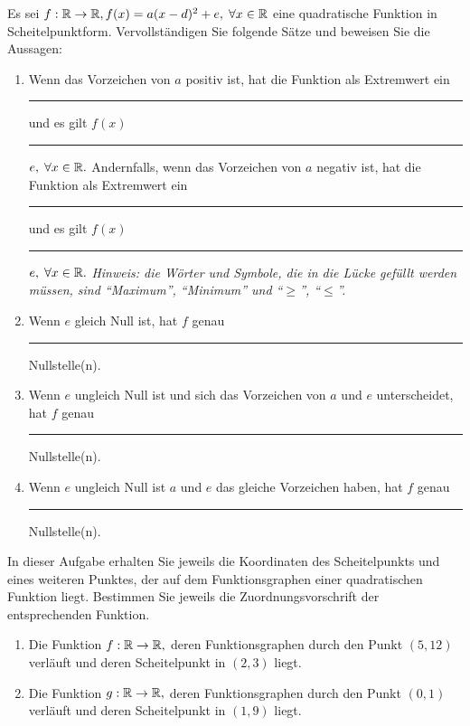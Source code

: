 \documentclass[12pt]{article}
\begin{document}
\begin{exercise}
Es sei $f: \mathbb{R} \rightarrow \mathbb{R}, f(x) = a(x-d)^2 + e, \; \forall x \in \mathbb{R}$ eine quadratische Funktion in Scheitelpunktform.
Vervollständigen Sie folgende Sätze und beweisen Sie die Aussagen:
\begin{enumerate}[label=\alph*)]
\item Wenn das Vorzeichen von $a$ positiv ist, hat die Funktion als Extremwert ein \rule{3cm}{0.5pt} und es gilt $f(x)$ \rule{0.5cm}{0.5pt} $e, \; \forall x \in \mathbb{R}.$ Andernfalls, wenn das Vorzeichen von $a$ negativ ist, hat die Funktion als Extremwert ein \rule{3cm}{0.5pt} und es gilt $f(x)$ \rule{0.5cm}{0.5pt} $e, \; \forall x \in \mathbb{R}.$ {\footnotesize \emph{Hinweis: die Wörter und Symbole, die in die Lücke gefüllt werden müssen, sind \emph{``Maximum'', ``Minimum''} und ``$\geqslant$'', ``$\leqslant$''.}}
\item Wenn $e$ gleich Null ist, hat $f$ genau \rule{1cm}{0.5pt} Nullstelle(n).

\item Wenn $e$ ungleich Null ist und sich das Vorzeichen von $a$ und $e$ unterscheidet, hat $f$ genau \rule{1cm}{0.5pt} Nullstelle(n).

\item Wenn $e$ ungleich Null ist $a$ und $e$ das gleiche Vorzeichen haben, hat $f$ genau \rule{1cm}{0.5pt} Nullstelle(n).
\end{enumerate}
\end{exercise}


\begin{exercise}
In dieser Aufgabe erhalten Sie jeweils die Koordinaten des Scheitelpunkts und eines weiteren Punktes, der auf dem Funktionsgraphen einer quadratischen Funktion liegt. Bestimmen Sie jeweils die Zuordnungsvorschrift der entsprechenden Funktion. \begin{enumerate}[label=\alph*)]
\item Die Funktion $f: \mathbb{R} \rightarrow \mathbb{R},$ deren Funktionsgraphen durch den Punkt $(5,12)$ verläuft und deren Scheitelpunkt in $(2,3)$ liegt.
\item Die Funktion $g: \mathbb{R} \rightarrow \mathbb{R},$  deren Funktionsgraphen durch den Punkt $(0,1)$ verläuft und deren Scheitelpunkt in $(1,9)$ liegt.
\end{enumerate}
\end{exercise}
\end{document}
